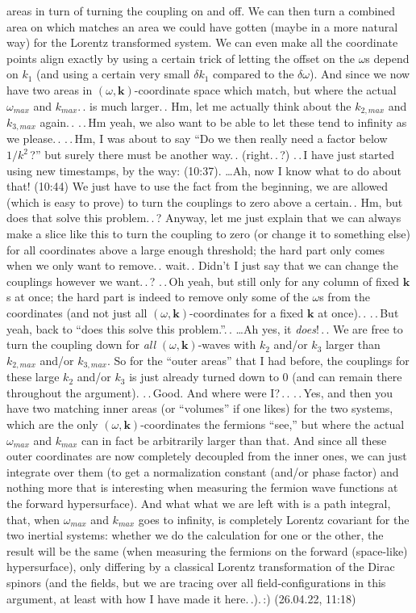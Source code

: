 \documentclass{report}
\begin{document}
areas in turn of turning the coupling on and off. We can then turn a combined area on which matches an area we could have gotten (maybe in a more natural way) for the Lorentz transformed system. We can even make all the coordinate points align exactly by using a certain trick of letting the offset on the $\omega$s depend on $k_1$ (and using a certain very small $\delta k_1$ compared to the $\delta \omega$). And since we now have two areas in $(\omega, \boldsymbol{k})$-coordinate space which match, but where the actual $\omega_{max}$ and $k_{max}$.\,. is much larger.\,. Hm, let me actually think about the $k_{2, max}$ and $k_{3, max}$ again.\,. .\,.\,Hm yeah, we also want to be able to let these tend to infinity as we please.\,. .\,.\,Hm, I was about to say ``Do we then really need a factor below $1/k^2$\,?'' but surely there must be another way.\,. (right.\,.\,?) .\,.\,I have just started using new timestamps, by the way: (10:37). \ldots Ah, now I know what to do about that! (10:44) We just have to use the fact from the beginning, we are allowed (which is easy to prove) to turn the couplings to zero above a certain.\,. Hm, but does that solve this problem.\,.\,? Anyway, let me just explain that we can always make a slice like this to turn the coupling to zero (or change it to something else) for all coordinates above a large enough threshold; the hard part only comes when we only want to remove.\,. wait.\,. Didn't I just say that we can change the couplings however we want.\,.\,? .\,.\,Oh yeah, but still only for any column of fixed $\boldsymbol{k}$s at once; the hard part is indeed to remove only some of the $\omega$s from the coordinates (and not just all $(\omega, \boldsymbol{k})$-coordinates for a fixed $\boldsymbol{k}$ at once).\,. .\,.\,But yeah, back to ``does this solve this problem.''.\,. \ldots Ah yes, it \emph{does}!\,.\,. We are free to turn the coupling down for \emph{all} $(\omega, \boldsymbol{k})$-waves with $k_2$ and/or $k_3$ larger than $k_{2, max}$ and/or $k_{3, max}$. So for the ``outer areas'' that I had before, the couplings for these large $k_2$ and/or $k_3$ is just already turned down to 0 (and can remain there throughout the argument). .\,.\,Good. And where were I?\,.\,. .\,.\,Yes, and then you have two matching inner areas (or ``volumes'' if one likes) for the two systems, which are the only $(\omega, \boldsymbol{k})$-coordinates the fermions ``see,'' but where the actual $\omega_{max}$ and $k_{max}$ can in fact be arbitrarily larger than that. And since all these outer coordinates are now completely decoupled from the inner ones, we can just integrate over them (to get a normalization constant (and/or phase factor) and nothing more that is interesting when measuring the fermion wave functions at the forward hypersurface). And what what we are left with is a path integral, that, when $\omega_{max}$ and $k_{max}$ goes to infinity, is completely Lorentz covariant for the two inertial systems: whether we do the calculation for one or the other, the result will be the same (when measuring the fermions on the forward (space-like) hypersurface), only differing by a classical Lorentz transformation of the Dirac spinors (and the fields, but we are tracing over all field-configurations in this argument, at least with how I have made it here.\,.).\,:) (26.04.22, 11:18)
\end{document}
